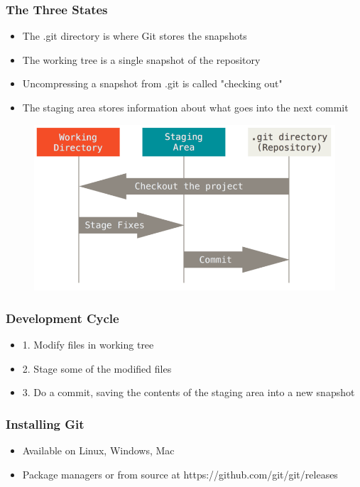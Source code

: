 \documentclass{beamer}
\begin{document}
\begin{frame}
	\frametitle{The Three States}
	\begin{itemize}
		\item{The .git directory is where Git stores the snapshots}
		\item{The working tree is a single snapshot of the repository}
		\item{Uncompressing a snapshot from .git is called "checking out"}
		\item{The staging area stores information about what goes into the next commit}
	\end{itemize}
	\begin{figure}
		\includegraphics[scale=0.25]{The_Three_States-0.png}
	\end{figure}
\end{frame}

\begin{frame}
	\frametitle{Development Cycle}
	\begin{itemize}
		\item{1. Modify files in working tree}
		\item{2. Stage some of the modified files}
		\item{3. Do a commit, saving the contents of the staging area into a new snapshot}
	\end{itemize}
\end{frame}

\begin{frame}
	\frametitle{Installing Git}
	\begin{itemize}
		\item{Available on Linux, Windows, Mac}
		\item{Package managers or from source at https://github.com/git/git/releases}
	\end{itemize}
\end{frame}
\end{document}
